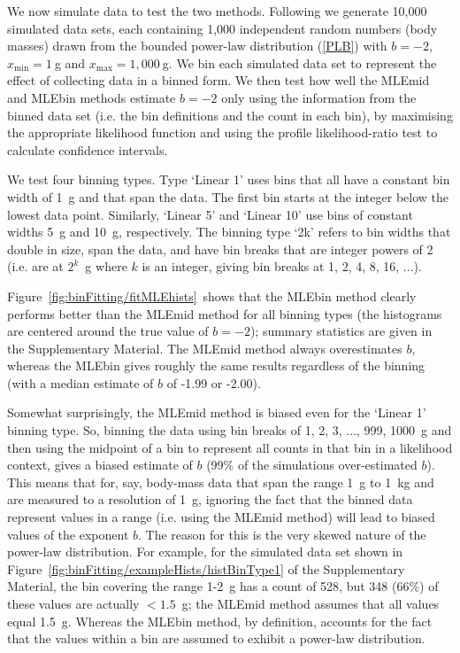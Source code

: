 \documentclass[12pt, letter]{article}
\newcommand{\xmin}{x_{\mathrm{min}}}
\newcommand{\xmax}{x_{\mathrm{max}}}
\newcommand{\fitMLEhists}{\ref{fig:binFitting/fitMLEhists}}
\newcommand{\MEE}{erpbb17}     %
\begin{document}
We now simulate data to test the two methods. Following \citet{\MEE} we generate
10,000 simulated data sets, each containing 1,000 independent random numbers
(body masses)
drawn from the bounded power-law distribution (\ref{PLB}) with $b=-2$, $\xmin=1~$g
and $\xmax=1,000~$g. We bin each simulated data set to
represent the effect of collecting data in a binned form.
We then test how well
the MLEmid and MLEbin methods estimate $b=-2$ only using the information from
the binned data set (i.e. the bin definitions and the count in each bin), by
maximising the appropriate likelihood function and using the profile
likelihood-ratio test \citep{hm97} to calculate confidence intervals.

We test four binning types. Type `Linear 1' uses bins that all
have a constant bin width of 1~g and that span the data. The first bin starts at
the integer below the lowest data point.
Similarly, `Linear 5' and `Linear 10' use bins of constant widths 5~g
and 10~g, respectively. The binning type `2k' refers to bin widths that double in
size, span the data, and have bin breaks that are integer powers of 2 (i.e. are
at $2^k$~g where $k$ is an integer, giving bin breaks at 1, 2, 4, 8, 16, ...).

Figure~\fitMLEhists~shows that the MLEbin method clearly performs better than
the MLEmid method for all binning types (the histograms are centered around the
true value of $b=-2$); summary statistics are given in the Supplementary
Material. The MLEmid method always overestimates $b$, whereas the
MLEbin gives roughly the same results regardless of the binning (with a median
estimate of $b$ of -1.99 or -2.00).

Somewhat surprisingly, the MLEmid method is biased even for the `Linear 1'
binning type. So, binning the data using bin breaks of 1, 2, 3, ..., 999, 1000~g
and then using the midpoint of a bin to represent all counts in that bin in a
likelihood context, gives a biased estimate of $b$ (99\% of the simulations
over-estimated $b$). This means that for, say, body-mass data that span the
range 1~g to 1~kg and are measured to a resolution of 1~g, ignoring the fact
that the binned data represent values in a range (i.e. using the MLEmid method)
will lead to biased values of the exponent $b$. The reason for this is the very
skewed nature of the power-law distribution. For example,
for the simulated data set
shown in Figure~\ref{fig:binFitting/exampleHists/histBinType1} of the
Supplementary Material, the
bin covering the range 1-2~g has a count of 528, but 348 (66\%) of these values
are actually $<1.5$~g; the MLEmid method assumes that all values equal
1.5~g. Whereas the MLEbin method, by definition, accounts for the fact that the
values within a bin are assumed to exhibit a power-law distribution.
\end{document}
